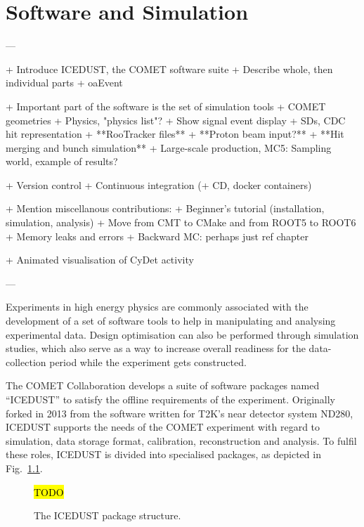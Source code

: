 \chapter{Software and Simulation}\label{chapter3}

\newcommand{\SimG}{\texttt{SimG4}\xspace}
\newcommand{\oaEvent}{\texttt{oaEvent}\xspace}
\newcommand{\Geant}{{\sc Geant4}\xspace}

\begin{markdown}
---

+ Introduce ICEDUST, the COMET software suite
    + Describe whole, then individual parts
    + oaEvent
 
+ Important part of the software is the set of simulation tools
    + COMET geometries
    + Physics, "physics list"?
    + Show signal event display
    + SDs, CDC hit representation
    + **RooTracker files**
    + **Proton beam input?**
    + **Hit merging and bunch simulation**
    + Large-scale production, MC5: Sampling world, example of results?
    
    
+ Version control
+ Continuous integration (+ CD, docker containers)
    
+ Mention miscellanous contributions:
    + Beginner's tutorial (installation, simulation, analysis)
    + Move from CMT to CMake and from ROOT5 to ROOT6
    + Memory leaks and errors
    + Backward MC: perhaps just ref chapter

+ Animated visualisation of CyDet activity

---
\end{markdown}

Experiments in high energy physics are commonly associated with the development of a set of software tools to help in manipulating and analysing experimental data. Design optimisation can also be performed through simulation studies, which also serve as a way to increase overall readiness for the data-collection period while the experiment gets constructed.

The COMET Collaboration develops a suite of software packages named ``ICEDUST'' to satisfy the offline requirements of the experiment. Originally forked in 2013 from the software written for T2K's near detector system ND280, ICEDUST supports the needs of the COMET experiment with regard to simulation, data storage format, calibration, reconstruction and analysis.
To fulfil these roles, ICEDUST is divided into specialised packages, as depicted in Fig.~\ref{fig:icedust_schematic}.

\begin{figure}
    \centering
    \hl{TODO}
    \caption{The ICEDUST package structure.}
    \label{fig:icedust_schematic}
\end{figure}

